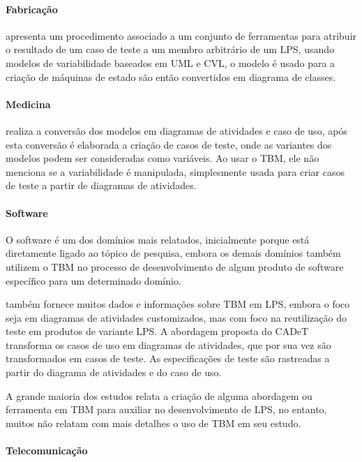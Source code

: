 \paragraph{\textbf{Fabricação}}

\cite{knapp2014use} apresenta um procedimento associado a um conjunto de ferramentas para atribuir o resultado de um caso de teste a um membro arbitrário de um LPS, usando modelos de variabilidade baseados em UML e CVL, o modelo é usado para a criação de máquinas de estado são então convertidos em diagrama de classes.

\paragraph{\textbf{Medicina}}

\cite{hasling2008model} realiza a conversão dos modelos em diagramas de atividades e caso de uso, após esta conversão é elaborada a criação de casos de teste, onde as variantes dos modelos podem ser consideradas como variáveis. Ao usar o TBM, ele não menciona se a variabilidade é manipulada, simplesmente usada para criar casos de teste a partir de diagramas de atividades.

\paragraph{\textbf{Software}}

O software é um dos domínios mais relatados, inicialmente porque está diretamente ligado ao tópico de pesquisa, embora os demais domínios também utilizem o TBM no processo de desenvolvimento de algum produto de software específico para um determinado domínio.

\cite{Olimpiew2008} também fornece muitos dados e informações sobre TBM em LPS, embora o foco seja em diagramas de atividades customizados, mas com foco na reutilização do teste em produtos de variante LPS. A abordagem proposta do CADeT transforma os casos de uso em diagramas de atividades, que por sua vez são transformados em casos de teste. As especificações de teste são rastreadas a partir do diagrama de atividades e do caso de uso.

A grande maioria dos estudos relata a criação de alguma abordagem ou ferramenta em TBM para auxiliar no desenvolvimento de LPS, no entanto, muitos não relatam com mais detalhes o uso de TBM em seu estudo.

\paragraph{\textbf{Telecomunicação}}

